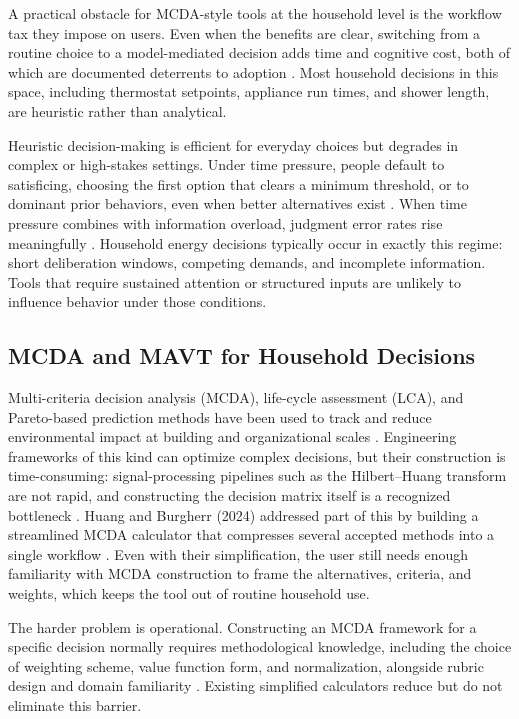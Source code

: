 \documentclass[final,3p,times]{elsarticle}
\begin{document}
A practical obstacle for MCDA-style tools at the household level is
the workflow tax they impose on users. Even when the benefits are
clear, switching from a routine choice to a model-mediated decision
adds time and cognitive cost, both of which are documented deterrents
to adoption \cite{ariely2001,leclerc1995,nah2004}. Most household
decisions in this space, including thermostat setpoints, appliance
run times, and shower length, are heuristic rather than analytical.

Heuristic decision-making is efficient for everyday choices but
degrades in complex or high-stakes settings. Under time pressure,
people default to satisficing, choosing the first option that clears
a minimum threshold, or to dominant prior behaviors, even when better
alternatives exist \cite{bobadilla2018}. When time pressure combines
with information overload, judgment error rates rise meaningfully
\cite{hahn1992,phillipswren2020}. Household energy decisions typically
occur in exactly this regime: short deliberation windows, competing
demands, and incomplete information. Tools that require sustained
attention or structured inputs are unlikely to influence behavior
under those conditions.

\subsection{MCDA and MAVT for Household Decisions}

Multi-criteria decision analysis (MCDA), life-cycle assessment (LCA),
and Pareto-based prediction methods have been used to track and reduce
environmental impact at building and organizational scales
\cite{huang2011}. Engineering frameworks of this kind
can optimize complex decisions, but their construction is
time-consuming: signal-processing pipelines such as the Hilbert--Huang
transform are not rapid, and constructing the decision matrix itself
is a recognized bottleneck \cite{desouza2022,huang2011}. Huang and Burgherr
(2024) addressed part of this by building a streamlined MCDA
calculator that compresses several accepted methods into a single
workflow \cite{huangburgherr2024}. Even with their simplification,
the user still needs enough familiarity with MCDA construction to
frame the alternatives, criteria, and weights, which keeps the tool
out of routine household use.

The harder problem is operational. Constructing an MCDA framework for
a specific decision normally requires methodological knowledge,
including the choice of weighting scheme, value function form, and
normalization, alongside rubric design and domain familiarity
\cite{desouza2022,huangburgherr2024}. Existing simplified
calculators reduce but do not eliminate this barrier.
\end{document}
